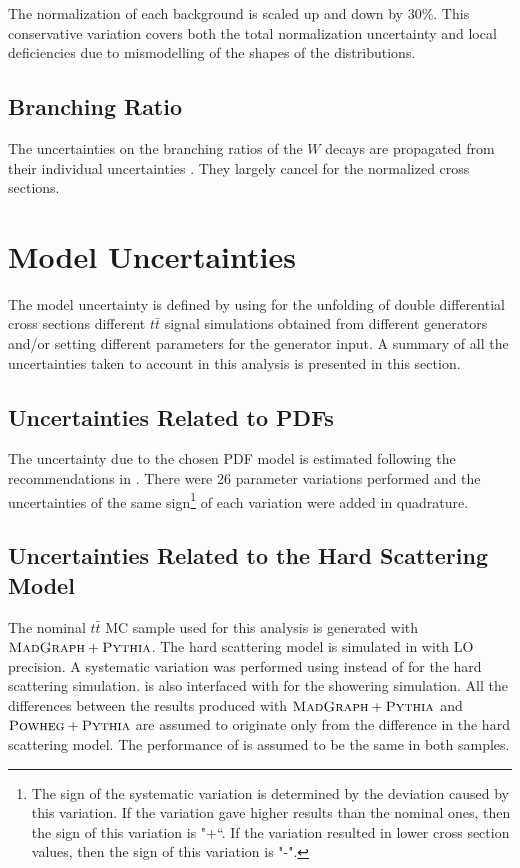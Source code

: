 The normalization of each background is scaled up and down by 30$\%$\cite{Asin2014Auth}. This conservative variation covers both the 
total normalization uncertainty and local deficiencies due to mismodelling of the shapes of the distributions. 

\subsection{Branching Ratio}

The uncertainties on the branching ratios of the $W$ decays are propagated from their individual uncertainties \cite{PDG-2012}.
They largely cancel for the normalized cross sections.
\section{Model Uncertainties}

The model uncertainty is defined by using for the unfolding of double differential cross sections different $t\bar{t}$ signal simulations 
obtained from different generators and/or setting
different parameters for the generator input. A summary of all the uncertainties taken to account in this analysis is presented 
in this section.

\subsection{Uncertainties Related to PDFs}

The uncertainty due to the chosen PDF model is estimated following the recommendations in \cite{Lai:2010vv}. There were 26 parameter variations
performed and the uncertainties of the same sign\footnote{The sign of the systematic variation is determined by the deviation caused by this
variation. If the variation gave higher results than the nominal ones, then the sign of this variation is "+``. If the variation resulted
in lower cross section values, then the sign of this variation is "-".} of each variation were added in quadrature.

\subsection{Uncertainties Related to the Hard Scattering Model}

The nominal $t\bar{t}$ MC sample used for this analysis is generated with $\textsc{MadGraph}+\textsc{Pythia}$. The hard scattering model is simulated
in \MG with LO precision. A systematic variation was performed using \Powheg instead of \MG for the hard scattering simulation.
\Powheg is also interfaced with \PYTHIA for the showering simulation. All the differences between the results produced with $\textsc{MadGraph}+\textsc{Pythia}$
and $\textsc{Powheg}+\textsc{Pythia}$ are assumed to originate only from the difference in the hard scattering model. The performance of \PYTHIA is assumed 
to be the same in both samples.

